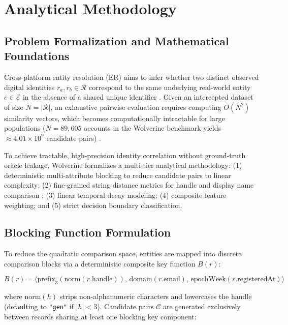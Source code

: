 \chapter{Analytical Methodology}
\label{chap:analytical_methodology}

\section{Problem Formalization and Mathematical Foundations}
\label{sec:math_problem}

Cross-platform entity resolution (ER) aims to infer whether two distinct observed digital identities $r_a, r_b \in \mathcal{R}$ correspond to the same underlying real-world entity $e \in \mathcal{E}$ in the absence of a shared unique identifier \cite{fellegi1969theory, getoor2012entity}. Given an intercepted dataset of size $N = |\mathcal{R}|$, an exhaustive pairwise evaluation requires computing $O(N^2)$ similarity vectors, which becomes computationally intractable for large populations ($N = 89,605$ accounts in the Wolverine benchmark yields $\approx 4.01 \times 10^9$ candidate pairs) \cite{christen2012data}.

To achieve tractable, high-precision identity correlation without ground-truth oracle leakage, Wolverine formalizes a multi-tier analytical methodology: (1) deterministic multi-attribute blocking to reduce candidate pairs to linear complexity; (2) fine-grained string distance metrics for handle and display name comparison \cite{cohen2003comparison}; (3) linear temporal decay modeling; (4) composite feature weighting; and (5) strict decision boundary classification.

\section{Blocking Function Formulation}
\label{sec:blocking_strategy}

To reduce the quadratic comparison space, entities are mapped into discrete comparison blocks via a deterministic composite key function $B(r)$:

\begin{equation}
\label{eq:blocking_key}
B(r) = \big\langle \text{prefix}_3(\text{norm}(r.\text{handle})), \, \text{domain}(r.\text{email}), \, \text{epochWeek}(r.\text{registeredAt}) \big\rangle
\end{equation}

where $\text{norm}(h)$ strips non-alphanumeric characters and lowercases the handle (defaulting to \texttt{"gen"} if $|h| < 3$). Candidate pairs $\mathcal{C}$ are generated exclusively between records sharing at least one blocking key component:

